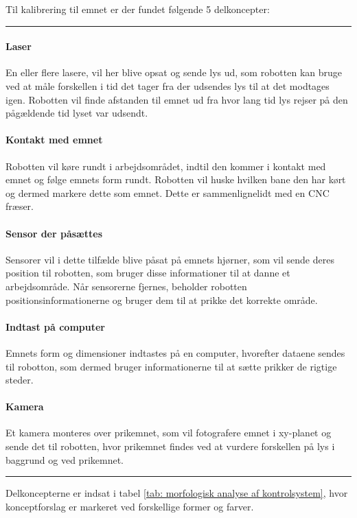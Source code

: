 Til kalibrering til emnet er der fundet følgende 5 delkoncepter: \plainbreak{0.5}
\paragraph{Laser}
En eller flere lasere, vil her blive opsat og sende lys ud, som robotten kan bruge ved at måle forskellen i tid det tager fra der udsendes lys til at det modtages igen. Robotten vil finde afstanden til emnet ud fra hvor lang tid lys rejser på den pågældende tid lyset var udsendt.

\paragraph{Kontakt med emnet}
Robotten vil køre rundt i arbejdsområdet, indtil den kommer i kontakt med emnet og følge emnets form rundt. Robotten vil huske hvilken bane den har kørt og dermed markere dette som emnet. Dette er sammenlignelidt med en CNC fræser.

\paragraph{Sensor der påsættes}
Sensorer vil i dette tilfælde blive påsat på emnets hjørner, som vil sende deres position til robotten, som bruger disse informationer til at danne et arbejdsområde. Når sensorerne fjernes, beholder robotten positionsinformationerne og bruger dem til at prikke det korrekte område.

\paragraph{Indtast på computer}
Emnets form og dimensioner indtastes på en computer, hvorefter dataene sendes til robotton, som dermed bruger informationerne til at sætte prikker de rigtige steder. 

\paragraph{Kamera} 
Et kamera monteres over prikemnet, som vil fotografere emnet i xy-planet og sende det til robotten, hvor prikemnet findes ved at vurdere forskellen på lys i baggrund og ved prikemnet. \plainbreak{1}

Delkoncepterne er indsat i tabel \ref{tab: morfologisk analyse af kontrolsystem}, hvor konceptforslag er markeret ved forskellige former og farver. 


